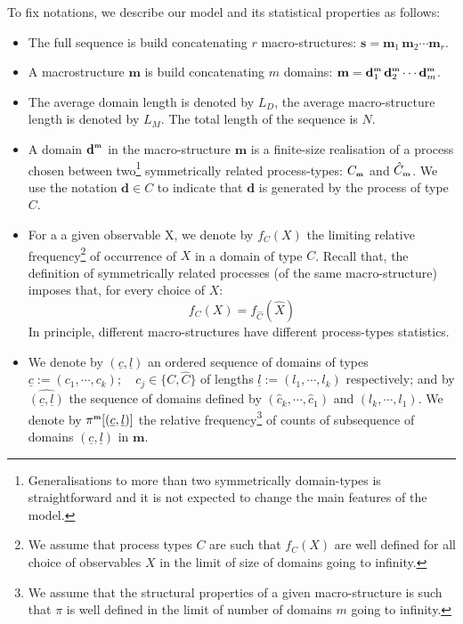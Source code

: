 \documentclass[fleqn,10pt]{wlscirep}
\def\sm{\textbf{\tiny m}}
\begin{document}
To fix notations, we describe our model and its statistical properties as follows:
\begin{itemize}
\item The full sequence is build  concatenating  $r$ macro-structures: $\textbf{s}=\textbf{m}_1\, \textbf{m}_2 \cdots \textbf{m}_r$. 
\item A macrostructure $\textbf{m}$ is build concatenating $m$ domains: $\textbf{m}=\textbf{d}^{\sm}_1\, \textbf{d}^{\sm}_2 \cdots \textbf{d}^{\sm}_{m}$.
\item The average domain length
is denoted by $L_D$, the average macro-structure length is denoted by $L_M$. The total length of the sequence is $N$.
\item  A domain $ \textbf{d}^{\sm}$ in the macro-structure $\textbf{m}$ is a  finite-size realisation of a process chosen between  two\footnote{Generalisations to more than two symmetrically domain-types is straightforward and it is not expected to change the main features of the model.}   symmetrically related  process-types: $C_{\sm}$ and  $\hat{C}_{\sm}$. We use the notation $\textbf{d} \in C$ to indicate that $\textbf{d}$ is generated by the process of type $C$.
\item For a a given observable X, we denote by $f_C(X)$ the limiting relative frequency\footnote{We assume that process types $C$ are such that $f_C(X)$  are well defined for all choice of observables $X$ in the limit of size of domains going to infinity.} of occurrence of $X$ in  a domain  of type $C$.  Recall that, the definition of  symmetrically related processes  (of the same macro-structure)  imposes that, for every choice of $X$:
\begin{equation}\label{symProbDomains}  
f_{C}(X)=f_{\hat{C}}(\hat{X})
\end{equation}
In principle,  different macro-structures have different process-types statistics.  
 \item
 We denote by $(\underline{c},\underline{l})$ an ordered sequence of domains of types $\underline{c}:=(c_1,\cdots,c_k); \quad c_j  \in  \{ C,\hat{C}\}$ of lengths $\underline{l}:=(l_1,\cdots,l_k)$ respectively; and by $\hat{(\underline{c},\underline{l})}$ 
  the sequence of domains defined by $(\hat{c}_k,\cdots,\hat{c}_1)$ and $(l_k,\cdots,l_1)$. We denote by $\pi^{\sm}[(\underline{c},\underline{l})]$ the relative frequency\footnote{We assume that the structural properties of a given macro-structure is such that $\pi$ is well defined in the limit of number of domains $m$ going to infinity.} of  counts of subsequence of domains $(\underline{c},\underline{l})$ in $\textbf{m}$. 
\\


\end{itemize}
\end{document}
